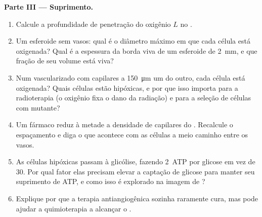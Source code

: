 \begin{problem}
\medskip
\noindent\textbf{Parte III --- Suprimento.}
\begin{enumerate}[resume]
  \item Calcule a profundidade de penetração do oxigênio $L$ no .
  \item Um esferoide sem vasos: qual é o diâmetro máximo em que cada
        célula está oxigenada? Qual é a espessura da borda viva de um
        esferoide de \qty{2}{mm}, e que fração de seu volume está viva?
  \item Num  vascularizado com capilares a \qty{150}{\micro m} um
        do outro, cada célula está oxigenada? Quais células estão
        hipóxicas, e por que isso importa para a radioterapia (o
        oxigênio fixa o dano da radiação) e para a seleção de células
        com  mutante?
  \item Um fármaco reduz à metade a densidade de capilares do .
        Recalcule o espaçamento e diga o que acontece com as células a
        meio caminho entre os vasos.
  \item As células hipóxicas passam à glicólise, fazendo \qty{2}{ATP}
        por glicose em vez de $30$. Por qual fator elas precisam elevar
        a captação de glicose para manter seu suprimento de ATP, e como
        isso é explorado na imagem de ?
  \item Explique por que a terapia antiangiogênica sozinha raramente
        cura, mas pode ajudar a quimioterapia a alcançar o .
\end{enumerate}


\end{problem}
